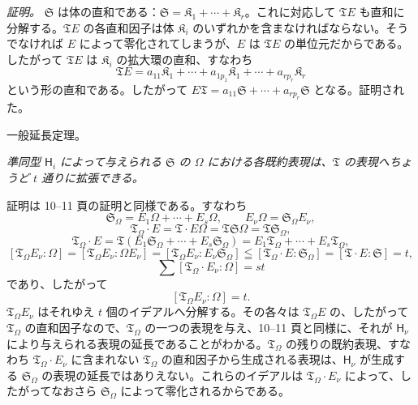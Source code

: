 \emph{証明。} $\mathfrak S$ は体の直和である：$\mathfrak S=\mathfrak K_1+\cdots+\mathfrak K_r$。これに対応して $\mathfrak T E$ も直和に分解する。$\mathfrak T E$ の各直和因子は体 $\mathfrak K_i$ のいずれかを含まなければならない。そうでなければ $E$ によって零化されてしまうが、$E$ は $\mathfrak T E$ の単位元だからである。したがって $\mathfrak T E$ は $\mathfrak K_i$ の拡大環の直和、すなわち
\[
\mathfrak T E=a_{11}\mathfrak K_1+\cdots+a_{1p_1}\mathfrak K_1+\cdots+a_{rp_r}\mathfrak K_r
\]
という形の直和である。したがって $E\mathfrak T=a_{11}\mathfrak S+\cdots+a_{rp_r}\mathfrak S$ となる。証明された。

\begin{center}
一般延長定理。
\end{center}

\emph{準同型 $\mathsf{H}_i$ によって与えられる $\mathfrak S$ の $\Omega$ における各既約表現は、$\mathfrak T$ の表現へちょうど $t$ 通りに拡張できる。}

証明は 10--11 頁の証明と同様である。すなわち
\[
\mathfrak S_\Omega=E_1\Omega+\cdots+E_s\Omega,\qquad
E_\nu\Omega=\mathfrak S_\Omega E_\nu,
\]
\[
\mathfrak T_\Omega\cdot E=\mathfrak T\cdot E\Omega
=\mathfrak T\mathfrak S\Omega=\mathfrak T\mathfrak S_\Omega,
\]
\[
\mathfrak T_\Omega\cdot E
=\mathfrak T(E_1\mathfrak S_\Omega+\cdots+E_s\mathfrak S_\Omega)
=E_1\mathfrak T_\Omega+\cdots+E_s\mathfrak T_\Omega,
\]
\[
[\mathfrak T_\Omega E_\nu:\Omega]
=[\mathfrak T_\Omega E_\nu:\Omega E_\nu]
=[\mathfrak T_\Omega E_\nu:E_\nu\mathfrak S_\Omega]
\leqq[\mathfrak T_\Omega\cdot E:\mathfrak S_\Omega]
=[\mathfrak T\cdot E:\mathfrak S]=t,
\]
\[
\sum[\mathfrak T_\Omega\cdot E_\nu:\Omega]=st
\]
であり、したがって
\[
[\mathfrak T_\Omega E_\nu:\Omega]=t.
\]
$\mathfrak T_\Omega E_\nu$ はそれゆえ $t$ 個のイデアルへ分解する。その各々は $\mathfrak T_\Omega E$ の、したがって $\mathfrak T_\Omega$ の直和因子なので、$\mathfrak T_\Omega$ の一つの表現を与え、10--11 頁と同様に、それが $\mathsf{H}_\nu$ により与えられる表現の延長であることがわかる。$\mathfrak T_\Omega$ の残りの既約表現、すなわち $\mathfrak T_\Omega\cdot E_\nu$ に含まれない $\mathfrak T_\Omega$ の直和因子から生成される表現は、$\mathsf{H}_\nu$ が生成する $\mathfrak S_\Omega$ の表現の延長ではありえない。これらのイデアルは $\mathfrak T_\Omega\cdot E_\nu$ によって、したがってなおさら $\mathfrak S_\Omega$ によって零化されるからである。

